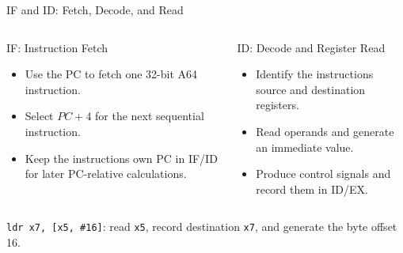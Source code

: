 \documentclass[aspectratio=169,11pt,t]{beamer}
\newcommand{\code}[1]{\texttt{#1}}
\begin{document}
\begin{frame}{IF and ID: Fetch, Decode, and Read}

\begin{columns}[T,onlytextwidth]
\begin{block}{IF: Instruction Fetch}
\begin{itemize}\setlength{\itemsep}{6pt}
\item Use the PC to fetch one 32-bit A64 instruction.
\item Select $PC+4$ for the next sequential instruction.
\item Keep the instruction\textquotesingle s own PC in IF/ID for later PC-relative calculations.
\end{itemize}
\end{block}
\begin{block}{ID: Decode and Register Read}
\begin{itemize}\setlength{\itemsep}{6pt}
\item Identify the instruction\textquotesingle s source and destination registers.
\item Read operands and generate an immediate value.
\item Produce control signals and record them in ID/EX.
\end{itemize}
\end{block}
\end{columns}
\vspace{.25cm}
\code{ldr x7, [x5, \#16]}: read \code{x5}, record destination \code{x7}, and generate the byte offset 16.

\end{frame}
\end{document}
